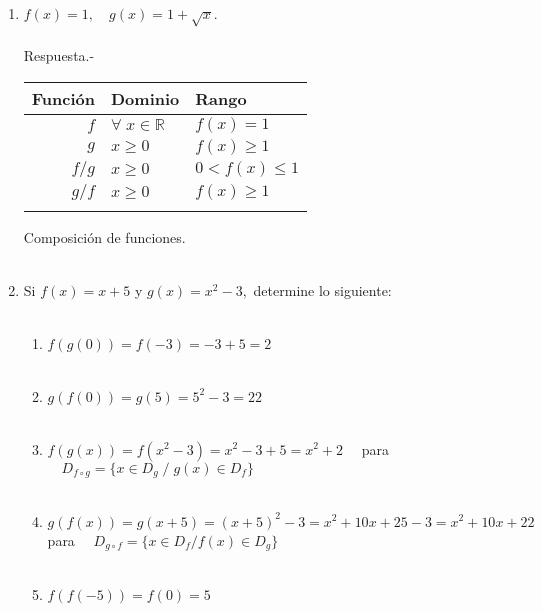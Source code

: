 \begin{enumerate}
\item $f(x)=1, \quad g(x)=1 + \sqrt{x}$.\\\\
    Respuesta.-\;
    \begin{center}
	\begin{tabular}{r l l}
	    Función&Dominio&Rango\\ 
	    \hline
	    $f$&$\forall \; x \in \mathbb{R}$&$f(x)=1$\\
	    $g$&$x\geq 0$&$f(x)\geq 1$\\
	    $f/g$&$x\geq 0$&$0<f(x)\leq 1$\\
	    $g/f$&$x \geq 0$&$f(x)\geq 1$\\\\
	\end{tabular}
    \end{center}

Composición de funciones.\\\\

\item Si $f(x)=x+5$ y $g(x)=x^2-3,$ determine lo siguiente:\\\\
\begin{enumerate}[\bfseries a.]
    
    \item $f(g(0)) = f(-3) = -3 + 5 = 2$\\\\

    \item $g(f(0)) = g(5) = 5^2 - 3 = 22$\\\\

    \item $f(g(x)) = f(x^2 - 3) = x^2 - 3 + 5 = x^2 + 2 \quad$ para $\quad D_{f\circ g} = \lbrace x \in D_g \; / \; g(x) \in D_f  \rbrace$\\\\

    \item $g(f(x)) = g(x+5) = (x+5)^2 - 3 = x^2 + 10x + 25 - 3 = x^2 + 10x + 22 \quad$ para $\quad D_{g\circ f} = \lbrace x\in D_f / f(x) \in D_g \rbrace$\\\\

    \item $f(f(-5)) = f(0) = 5$\\\\


\end{enumerate}
\end{enumerate}
